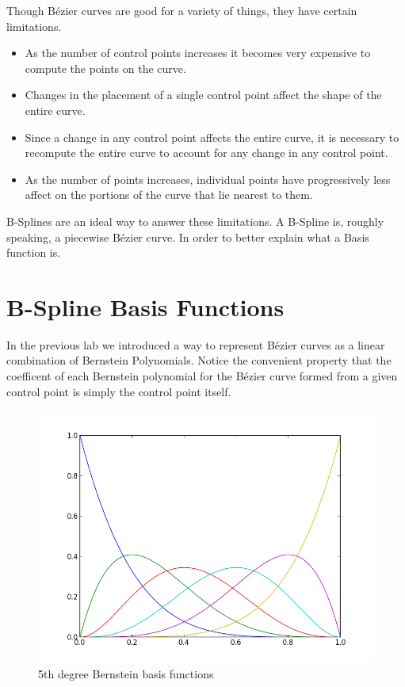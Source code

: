Though B\'{e}zier curves are good for a variety of things, they have certain limitations.
\begin{itemize}
\item As the number of control points increases it becomes very expensive to compute the points on the curve.
\item Changes in the placement of a single control point affect the shape of the entire curve.
\item Since a change in any control point affects the entire curve, it is necessary to recompute the entire curve to account for any change in any control point.
\item As the number of points increases, individual points have progressively less affect on the portions of the curve that lie nearest to them.
\end{itemize}

B-Splines are an ideal way to answer these limitations.
A B-Spline is, roughly speaking, a piecewise B\'{e}zier curve.
In order to better explain what a Basis function is.

\section*{B-Spline Basis Functions}

In the previous lab we introduced a way to represent B\'{e}zier curves as a linear combination of Bernstein Polynomials.
Notice the convenient property that the coefficent of each Bernstein polynomial for the B\'{e}zier curve formed from a given control point is simply the control point itself.

\begin{figure}
\includegraphics[width=\textwidth]{bernstein_basis}
\caption{5th degree Bernstein basis functions}
\end{figure}

